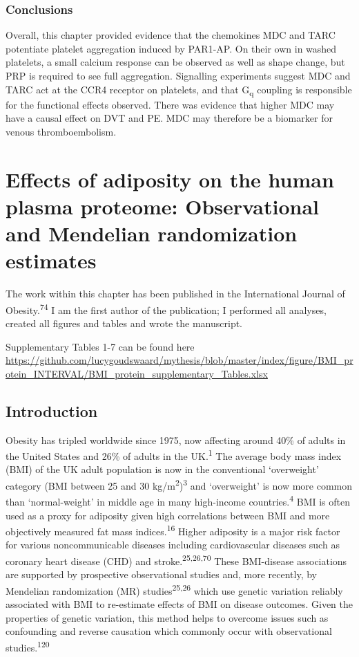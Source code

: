 \documentclass[11pt,twoside]{bristolthesis}
\begin{document}
\hypertarget{conclusions}{%
\subsection{Conclusions}\label{conclusions}}

Overall, this chapter provided evidence that the chemokines MDC and TARC potentiate platelet aggregation induced by PAR1-AP. On their own in washed platelets, a small calcium response can be observed as well as shape change, but PRP is required to see full aggregation. Signalling experiments suggest MDC and TARC act at the CCR4 receptor on platelets, and that G\textsubscript{q} coupling is responsible for the functional effects observed. There was evidence that higher MDC may have a causal effect on DVT and PE. MDC may therefore be a biomarker for venous thromboembolism.

\hypertarget{BMI-protein-MR}{%
\chapter{Effects of adiposity on the human plasma proteome: Observational and Mendelian randomization estimates}\label{BMI-protein-MR}}

The work within this chapter has been published in the International Journal of Obesity.\textsuperscript{74} I am the first author of the publication; I performed all analyses, created all figures and tables and wrote the manuscript.

Supplementary Tables 1-7 can be found here \url{https://github.com/lucygoudswaard/mythesis/blob/master/index/figure/BMI_protein_INTERVAL/BMI_protein_supplementary_Tables.xlsx}

\hypertarget{introduction-1}{%
\section{Introduction}\label{introduction-1}}

Obesity has tripled worldwide since 1975, now affecting around 40\% of adults in the United States and 26\% of adults in the UK.\textsuperscript{1} The average body mass index (BMI) of the UK adult population is now in the conventional `overweight' category (BMI between 25 and 30 kg/m\textsuperscript{2})\textsuperscript{3} and `overweight' is now more common than `normal-weight' in middle age in many high-income countries.\textsuperscript{4} BMI is often used as a proxy for adiposity given high correlations between BMI and more objectively measured fat mass indices.\textsuperscript{16} Higher adiposity is a major risk factor for various noncommunicable diseases including cardiovascular diseases such as coronary heart disease (CHD) and stroke.\textsuperscript{25,26,70} These BMI-disease associations are supported by prospective observational studies and, more recently, by Mendelian randomization (MR) studies\textsuperscript{25,26} which use genetic variation reliably associated with BMI to re-estimate effects of BMI on disease outcomes. Given the properties of genetic variation, this method helps to overcome issues such as confounding and reverse causation which commonly occur with observational studies.\textsuperscript{120}
\end{document}
